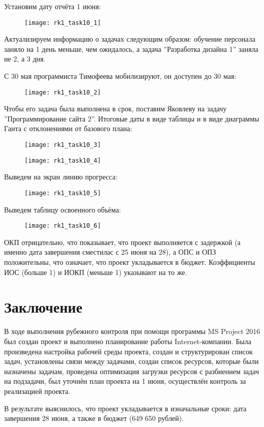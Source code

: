 Установим дату отчёта 1 июня:

\begin{figure}[h!]
	\texttt{[image: rk1\_task10\_1]}
\end{figure}

Актуализируем информацию о задачах следующим образом: обучение персонала заняло на 1 день меньше, чем ожидалось, а задача ''Разработка дизайна 1'' заняла не 2, а 3 дня. 

С 30 мая программиста Тимофеева мобилизируют, он доступен до 30 мая:

\begin{figure}[h!]
	\texttt{[image: rk1\_task10\_2]}
\end{figure}

Чтобы его задача была выполнена в срок, поставим Яковлеву на задачу ''Программирование сайта 2''. Итоговые даты в виде таблицы и в виде диаграммы Ганта с отклонениями от базового плана:

\begin{figure}[h!]
	\texttt{[image: rk1\_task10\_3]}
\end{figure}

\begin{figure}[h!]
	\texttt{[image: rk1\_task10\_4]}
\end{figure}
\clearpage
Выведем на экран линию прогресса:

\begin{figure}[h!]
	\texttt{[image: rk1\_task10\_5]}
\end{figure}

\clearpage

Выведем таблицу освоенного объёма: 

\begin{figure}[h!]
	\texttt{[image: rk1\_task10\_6]}
\end{figure}

ОКП отрицательно, что показывает, что проект выполняется с задержкой (а именно дата завершения сместилас с 25 июня на 28), а ОПС и ОПЗ положительны, что означает, что проект укладывается в бюджет. Коэффициенты ИОС (больше 1) и ИОКП (меньше 1) указывают на то же.

\clearpage

\section*{Заключение}

В ходе выполнения рубежного контроля при помощи программы MS Project 2016 был создан проект и выполнено планирование работы Internet-компании. Была произведена настройка рабочей среды проекта, создан и структурирован список задач, установлены связи между задачами, создан список ресурсов, которые были назначены задачам, проведена оптимизация загрузки ресурсов с разбиением задач на подзадачи, был уточнён план проекта на 1 июня, осуществлён контроль за реализацией проекта.

В результате выяснилось, что проект укладывается в изначальные сроки: дата завершения 28 июня, а также в бюджет (649 650 рублей).

